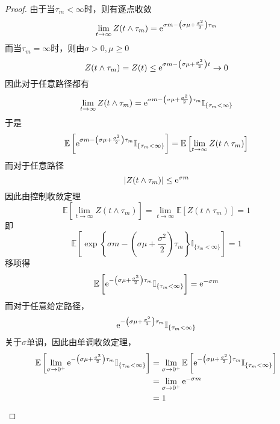 \documentclass[cn]{homework}
\newcommand{\E}{\mathbb E}
\begin{document}
\begin{subproblem}
        \item
        \begin{proof}
            由于当$\tau_m<\infty$时，则有逐点收敛
            \[\lim_{t\to\infty}Z(t\land\tau_m)
            =\mathrm e^{\sigma m-\left(\sigma\mu+\frac{\sigma^2}{2}\right)\tau_m}\]
            而当$\tau_m=\infty$时，则由$\sigma> 0,\mu\geq 0$
            \[Z(t\land\tau_m)=Z(t)\leq
            \mathrm e^{\sigma m-\left(\sigma\mu+\frac{\sigma^2}{2}\right)t}
            \to 0\]
            因此对于任意路径都有
            \[\lim_{t\to\infty}Z(t\land\tau_m)
            =\mathrm e^{\sigma m-\left(\sigma\mu+\frac{\sigma^2}{2}\right)\tau_m}
            \mathbb I_{\{\tau_m<\infty\}}\]
            于是
            \[\E\left[
            \e^{\sigma m-\left(\sigma\mu+\frac{\sigma^2}{2}\right)\tau_m}
            \mathbb I_{\{\tau_m<\infty\}}\right]
            =\E\left[\lim_{t\to\infty}Z(t\land\tau_m)\right]\]
            而对于任意路径
            \[|Z(t\land\tau_m)|\leq\mathrm e^{\sigma m}\]
            因此由控制收敛定理
            \[\E\left[\lim_{t\to\infty}Z(t\land\tau_m)\right]
            =\lim_{t\to\infty}\E[Z(t\land\tau_m)]=1\]
            即
            \[\E\left[
                \exp\left\{
                    \sigma m-\left(\sigma\mu+\frac{\sigma^2}{2}\right)\tau_m
                    \right\}
                \mathbb I_{\{\tau_m<\infty\}}
            \right]=1\]
            移项得
            \begin{equation}
                \label{eq:laplace}
                \E\left[\e^{-\left(\sigma\mu+\frac{\sigma^2}{2}\right)\tau_m}
                \mathbb I_{\{\tau_m<\infty\}}\right]
                =\e^{-\sigma m}
            \end{equation}
            而对于任意给定路径，
            \[\mathrm e^{-\left(\sigma\mu+\frac{\sigma^2}{2}\right)\tau_m}
            \mathbb I_{\{\tau_m<\infty\}}\]
            关于$\sigma$单调，因此由单调收敛定理，
            \[\begin{aligned}
                \E\left[
                \lim_{\sigma\to0^+}
                \e^{-\left(\sigma\mu+\frac{\sigma^2}{2}\right)\tau_m}
                \mathbb I_{\{\tau_m<\infty\}}
            \right]&=
            \lim_{\sigma\to0^+}
            \E\left[\e^{-\left(\sigma\mu+\frac{\sigma^2}{2}\right)\tau_m}
            \mathbb I_{\{\tau_m<\infty\}}\right]\\
            &=\lim_{\sigma\to0^+}\e^{-\sigma m}\\
            &=1\\
            \end{aligned}\]

\end{proof}
\end{subproblem}
\end{document}
